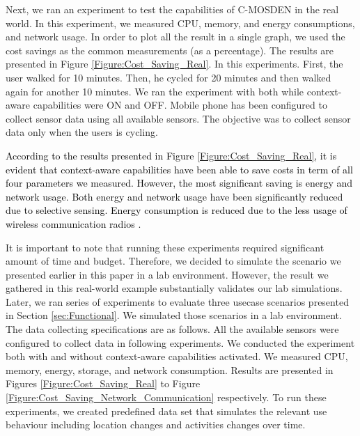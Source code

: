 \documentclass[journal]{IEEEtran}
\begin{document}
Next, we ran an experiment to test the capabilities of C-MOSDEN in the real world. In this experiment, we measured CPU, memory, and energy consumptions, and network usage. In order to plot all the result in a single graph, we used the cost savings as the common measurements  (as a percentage). The results are presented in Figure \ref{Figure:Cost_Saving_Real}.  In this experiments. First, the user walked for 10 minutes. Then, he cycled for 20 minutes and then  walked again for another 10 minutes. We ran the experiment with both while context-aware capabilities were ON and OFF. Mobile phone has been configured to collect sensor data using all available sensors. The objective was to collect sensor data only when the users is cycling.

\textcolor{black}{According to the results presented in Figure \ref{Figure:Cost_Saving_Real}, it is evident that context-aware capabilities have been able to save costs in term of all four parameters we measured. However, the most significant saving is energy and network usage. Both energy and network usage have been significantly reduced due to selective sensing. Energy consumption is reduced due to the less usage of wireless communication radios \cite{TCSS3}.}

It is important to note that running  these experiments required significant amount of time and budget. Therefore, we decided to simulate the scenario we presented earlier in this paper in a lab environment. However, the result we gathered in this real-world example substantially validates our lab simulations.
Later, we ran series of experiments to evaluate three usecase scenarios presented in Section \ref{sec:Functional}. We simulated those scenarios in a lab environment. The data collecting specifications are as follows. All the available sensors were configured to collect data in following experiments. We conducted the experiment both with and without context-aware capabilities activated. We measured CPU, memory, energy, storage, and network consumption. Results are presented  in Figures \ref{Figure:Cost_Saving_Real} to Figure \ref{Figure:Cost_Saving_Network_Communication} respectively. To run these experiments, we created predefined data set that simulates the relevant use behaviour including location changes and activities changes over time.
\end{document}
